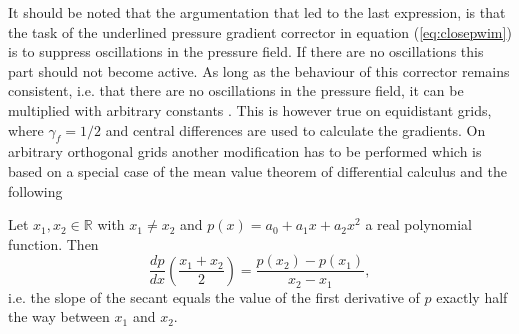   It should be noted that the argumentation that led to the last expression, is that the task of the underlined pressure gradient corrector in equation (\ref{eq:closepwim}) is to suppress oscillations in the pressure field. If there are no oscillations this part should not become active. As long as the behaviour of this corrector remains consistent, i.e. that there are no oscillations in the pressure field, it can be multiplied with arbitrary constants \cite{ferziger02}. This is however true on equidistant grids, where \(\gamma_f = 1/2\) and central differences are used to calculate the gradients. On arbitrary orthogonal grids another modification has to be performed which is based on a special case of the mean value theorem of differential calculus and the following 
\begin{prop}
  Let \(x_1,x_2 \in \mathbb{R}\) with \(x_1 \neq x_2\) and \(p(x) = a_0 + a_1 x + a_2 x^2\) a real polynomial function. Then 
  \begin{displaymath}
    \frac{dp}{dx}\left(\frac{x_1+x_2}{2}\right) = \frac{p(x_2) - p(x_1)}{x_2 - x_1},
  \end{displaymath}
  i.e. the slope of the secant equals the value of the first derivative of \(p\) exactly half the way between \(x_1\) and \(x_2\).
\end{prop}

